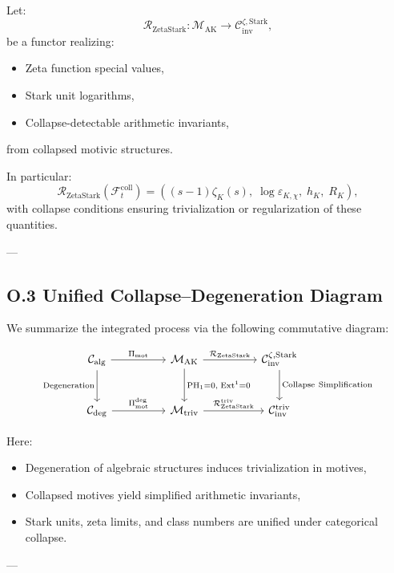 \documentclass[11pt]{article}
\begin{document}
Let:
\[
\mathcal{R}_{\mathrm{ZetaStark}} : \mathcal{M}_{\mathrm{AK}} \longrightarrow \mathcal{C}_{\mathrm{inv}}^{\zeta, \mathrm{Stark}},
\]
be a functor realizing:
\begin{itemize}
  \item Zeta function special values,
  \item Stark unit logarithms,
  \item Collapse-detectable arithmetic invariants,
\end{itemize}
from collapsed motivic structures.

In particular:
\[
\mathcal{R}_{\mathrm{ZetaStark}}(\mathcal{F}_t^{\mathrm{coll}}) =
\left( (s - 1)\zeta_K(s),\; \log \varepsilon_{K,\chi},\; h_K,\; R_K \right),
\]
with collapse conditions ensuring trivialization or regularization of these quantities.

---

\subsection*{O.3 Unified Collapse–Degeneration Diagram}

We summarize the integrated process via the following commutative diagram:

\[
\begin{tikzcd}[column sep=huge, row sep=large]
\mathcal{C}_{\mathrm{alg}} \arrow[r, "{\Pi_{\mathrm{mot}}}"] \arrow[d, "{\mathrm{Degeneration}}"']
& \mathcal{M}_{\mathrm{AK}} \arrow[r, "{\mathcal{R}_{\mathrm{ZetaStark}}}"] \arrow[d, "{\mathrm{PH}_1 = 0,\; \mathrm{Ext}^1 = 0}"]
& \mathcal{C}_{\mathrm{inv}}^{\zeta,\mathrm{Stark}} \arrow[d, "{\mathrm{Collapse\ Simplification}}"] \\
\mathcal{C}_{\mathrm{deg}} \arrow[r, "{\Pi_{\mathrm{mot}}^{\mathrm{deg}}}"]
& \mathcal{M}_{\mathrm{triv}} \arrow[r, "{\mathcal{R}_{\mathrm{ZetaStark}}^{\mathrm{triv}}}"]
& \mathcal{C}_{\mathrm{inv}}^{\mathrm{triv}}
\end{tikzcd}
\]


Here:
\begin{itemize}
  \item Degeneration of algebraic structures induces trivialization in motives,
  \item Collapsed motives yield simplified arithmetic invariants,
  \item Stark units, zeta limits, and class numbers are unified under categorical collapse.
\end{itemize}

---
\end{document}
